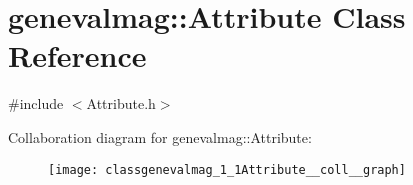 \hypertarget{classgenevalmag_1_1Attribute}{
\section{genevalmag::Attribute Class Reference}
\label{classgenevalmag_1_1Attribute}
}


{\ttfamily \#include $<$Attribute.h$>$}



Collaboration diagram for genevalmag::Attribute:\nopagebreak
\begin{figure}[H]
\begin{center}
\leavevmode
\texttt{[image: classgenevalmag\_1\_1Attribute\_\_coll\_\_graph]}
\end{center}
\end{figure}
